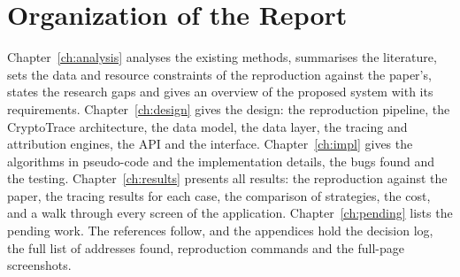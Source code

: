 \section{Organization of the Report}
Chapter~\ref{ch:analysis} analyses the existing methods, summarises the literature, sets the data and resource constraints of the reproduction against the paper's, states the research gaps and gives an overview of the proposed system with its requirements. Chapter~\ref{ch:design} gives the design: the reproduction pipeline, the CryptoTrace architecture, the data model, the data layer, the tracing and attribution engines, the API and the interface. Chapter~\ref{ch:impl} gives the algorithms in pseudo-code and the implementation details, the bugs found and the testing. Chapter~\ref{ch:results} presents all results: the reproduction against the paper, the tracing results for each case, the comparison of strategies, the cost, and a walk through every screen of the application. Chapter~\ref{ch:pending} lists the pending work. The references follow, and the appendices hold the decision log, the full list of addresses found, reproduction commands and the full-page screenshots.
